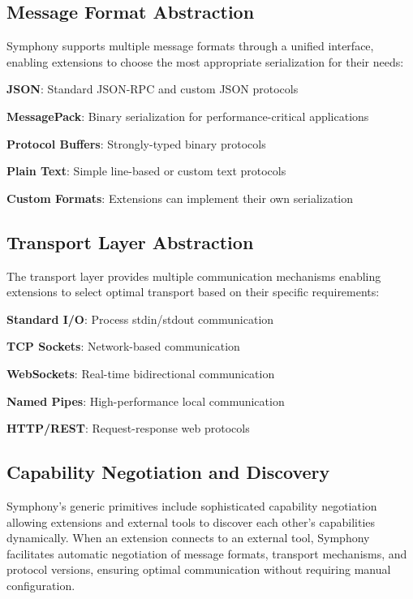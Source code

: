 \subsection*{Message Format Abstraction}

Symphony supports multiple message formats through a unified interface, enabling extensions to choose the most appropriate serialization for their needs:

\begin{compactlist}
    \item \textbf{JSON}: Standard JSON-RPC and custom JSON protocols
    \item \textbf{MessagePack}: Binary serialization for performance-critical applications
    \item \textbf{Protocol Buffers}: Strongly-typed binary protocols
    \item \textbf{Plain Text}: Simple line-based or custom text protocols
    \item \textbf{Custom Formats}: Extensions can implement their own serialization
\end{compactlist}

\subsection*{Transport Layer Abstraction}

The transport layer provides multiple communication mechanisms enabling extensions to select optimal transport based on their specific requirements:

\begin{compactlist}
    \item \textbf{Standard I/O}: Process stdin/stdout communication
    \item \textbf{TCP Sockets}: Network-based communication
    \item \textbf{WebSockets}: Real-time bidirectional communication
    \item \textbf{Named Pipes}: High-performance local communication
    \item \textbf{HTTP/REST}: Request-response web protocols
\end{compactlist}

\subsection*{Capability Negotiation and Discovery}

Symphony's generic primitives include sophisticated capability negotiation allowing extensions and external tools to discover each other's capabilities dynamically. When an extension connects to an external tool, Symphony facilitates automatic negotiation of message formats, transport mechanisms, and protocol versions, ensuring optimal communication without requiring manual configuration.

